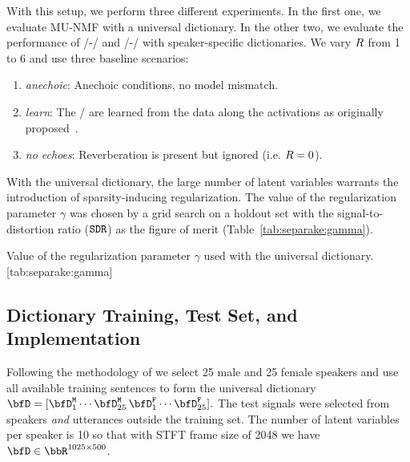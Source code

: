 \mynewline
With this setup, we perform three different experiments.
In the first one, we evaluate MU-NMF with a universal dictionary.
In the other two, we evaluate the performance of \MU/-\NMF/ and \EM/-\NMF/ with speaker-specific dictionaries.
We vary $R$ from 1 to 6 and use three baseline scenarios:
\begin{enumerate}
\item \textit{anechoic}: Anechoic conditions, no model mismatch.
\item \textit{learn}: The \RTFs/ are learned from the data along the activations as originally proposed~.
\item \textit{no echoes}: Reverberation is present but ignored (i.e. $R=0$).
\end{enumerate}
With the universal dictionary, the large number of latent variables warrants the introduction of sparsity-inducing regularization.
The value of the regularization parameter $\gamma$ was chosen by a grid search on a holdout set with the signal-to-distortion ratio ($\mathtt{SDR}$) as the figure of merit  (Table~\cref{tab:separake:gamma}).

\begin{table}
    \begin{sidecaption}[]{
        Value of the regularization parameter $\gamma$ used with the universal dictionary.
        }[tab:separake:gamma]
        \centering
        \small
        
    \end{sidecaption}
\end{table}


\subsection{Dictionary Training, Test Set, and Implementation}

\begin{figure}[h]
    \begin{fullwidth}
    \centering
        \hfill
    \label{fig:separake:results}
    \end{fullwidth}
\end{figure}


 Following the methodology of  we select 25 male and 25 female speakers
and use all available training sentences to form the universal dictionary
$
    \mD = [\mD_1^\mathtt{M}\cdots \mD_{25}^\mathtt{M}\,\mD_{1}^\mathtt{F}\cdots\mD_{25}^\mathtt{F}].
$
The test signals were selected from speakers \emph{and} utterances outside the training set.
The number of latent variables per speaker is 10 so that with STFT frame size of 2048 we have $\mD\in\R^{1025\times500}$.

